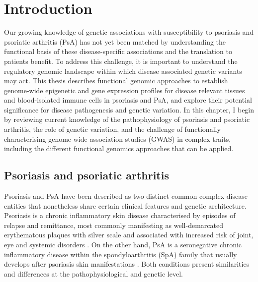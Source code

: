 \chapter{Introduction}
\label{ch:Intro}



Our growing knowledge of genetic associations with susceptibility to psoriasis and psoriatic arthritis (PsA) has not yet been matched by understanding the functional basis of these disease-specific associations and the translation to patients benefit. To address this challenge, it is important to understand the regulatory genomic landscape within which disease associated genetic variants may act. This thesis describes functional genomic approaches to establish genome-wide epigenetic and gene expression profiles for disease relevant tissues and blood-isolated immune cells in psoriasis and PsA, and explore their potential significance for disease pathogenesis and genetic variation. In this chapter, I begin by reviewing current knowledge of the pathophysiology of psoriasis and psoriatic arthritis, the role of genetic variation, and the challenge of functionally characterising genome-wide association studies (GWAS) in complex traits, including the different functional genomics approaches that can be applied.

\section{Psoriasis and psoriatic arthritis}
%
Psoriasis and PsA have been described as two distinct common complex disease entities that nonetheless share certain clinical features and genetic architecture. Psoriasis is a chronic inflammatory skin disease characterised by episodes of relapse and remittance, most commonly manifesting as well-demarcated erythematous plaques with silver scale and associated with increased risk of joint, eye and systemic disorders \parencite{Nestle2009}. On the other hand, PsA is a seronegative chronic inflammatory disease within the spondyloarthritis (SpA) family that usually develops after psoriasis skin manifestations \parencite{Moll1973, Coates2016, Villanova2013}. Both conditions present similarities and differences at the pathophysiological and genetic level.


